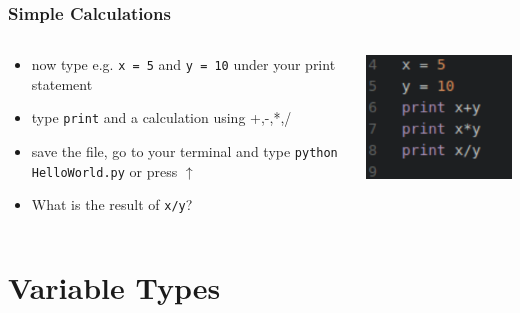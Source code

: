\documentclass{beamer}
\begin{document}
\begin{frame}
\frametitle{Simple Calculations}
	\begin{columns}[T]
		\begin{column}[T]{7cm}
			\begin{itemize}
				\item now type e.g. \texttt{x = 5} and \texttt{y = 10} under your print statement
				\item type \texttt{print} and a calculation using +,-,*,/
				\item save the file, go to your terminal and type \texttt{python HelloWorld.py} or press $\uparrow$
				\item What is the result of \texttt{x/y}?
			\end{itemize}
		\end{column}
		\begin{column}[T]{3cm}
			\includegraphics[width = 1\textwidth]{SimpleCalculations.pdf}
		\end{column}
	\end{columns}
\end{frame}

\section{Variable Types}
\end{document}
